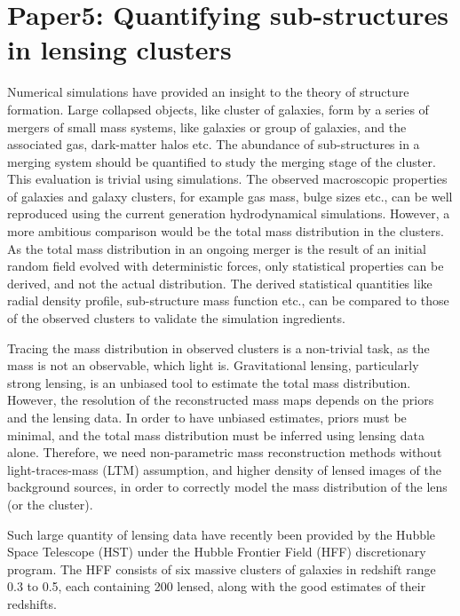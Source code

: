 \chapter{Paper5: Quantifying sub-structures in lensing clusters}\label{paper:substructures}

Numerical simulations have provided an insight to the theory of structure formation. 
Large collapsed objects, like cluster of galaxies, form by a series of mergers of 
small mass systems, like galaxies or group of galaxies, and the associated gas, dark-matter
halos etc. The abundance of sub-structures in a merging system should be quantified 
to study the merging stage of the cluster. This evaluation is trivial using simulations. 
The observed macroscopic properties of galaxies and galaxy clusters, for example 
gas mass, bulge sizes
etc., can be well reproduced using the current generation hydrodynamical simulations. 
However, a more ambitious comparison would be the total mass distribution in the
clusters. As the total mass distribution in an ongoing merger is the result
of an initial random field evolved with deterministic forces, only statistical
properties can be derived, and not the actual distribution. The derived statistical
quantities like radial density profile, sub-structure mass function etc., can be
compared to those of the observed clusters to validate the simulation
ingredients. 

Tracing the mass distribution in observed clusters is a non-trivial task, as 
the mass is not an observable, which light is. Gravitational lensing, particularly
strong lensing, is an unbiased 
tool to estimate the total mass distribution. However, the resolution of the
reconstructed mass maps depends on the priors and the lensing data. In order to
have unbiased estimates, priors must be minimal, and the total mass distribution
must be inferred using lensing data alone. Therefore, we need non-parametric
mass reconstruction methods without light-traces-mass (LTM) assumption, and higher
density of lensed images of the background sources, in order to correctly model 
the mass distribution of the lens (or the cluster).

Such large quantity of lensing data have recently been provided by the Hubble Space
Telescope (HST) under the Hubble Frontier Field (HFF) discretionary program. The HFF 
consists of six massive clusters of galaxies in redshift range 0.3 to 0.5, each 
containing 200 lensed, along 
with the good estimates of their redshifts. 

